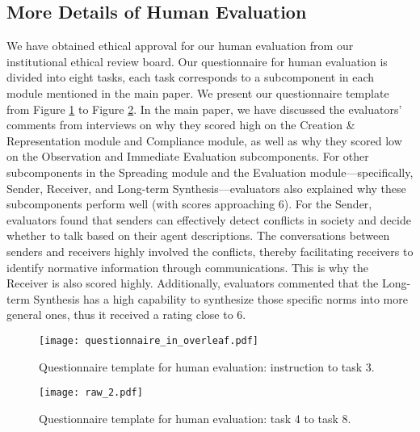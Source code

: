 \documentclass{article}
\begin{document}
\begin{appendices}
\section{More Details of Human Evaluation}
\setcounter{figure}{0}
We have obtained ethical approval for our human evaluation from our institutional ethical review board. Our questionnaire for human evaluation is divided into eight tasks, each task corresponds to a subcomponent in each module mentioned in the main paper. We present our questionnaire template from Figure \ref{questionnaire 1: creation} to Figure \ref{questionnaire 2: sender}. 
In the main paper, we have discussed the evaluators' comments from interviews on why they scored high on the Creation \& Representation module and Compliance module, as well as why they scored low on the Observation and Immediate Evaluation subcomponents. For other subcomponents in the Spreading module and the Evaluation module---specifically, Sender, Receiver, and Long-term Synthesis---evaluators also explained why these subcomponents perform well (with scores approaching 6). For the Sender, evaluators found that senders can effectively detect conflicts in society and decide whether to talk based on their agent descriptions. The conversations between senders and receivers highly involved the conflicts, thereby facilitating receivers to identify normative information through communications. This is why the Receiver is also scored highly. Additionally, evaluators commented that the Long-term Synthesis has a high capability to synthesize those specific norms into more general ones, thus it received a rating close to 6.
\begin{figure}[H]
    \centering
    \texttt{[image: questionnaire\_in\_overleaf.pdf]}
    \vspace{-0.3cm}
    \caption{Questionnaire template for human evaluation: instruction to task 3.
    }
    \label{questionnaire 1: creation}
\end{figure}

\begin{figure}[H]
    \centering
    \texttt{[image: raw\_2.pdf]}
    \caption{Questionnaire template for human evaluation: task 4 to task 8.
    }
    \label{questionnaire 2: sender}
\end{figure}



\end{appendices}
\end{document}
